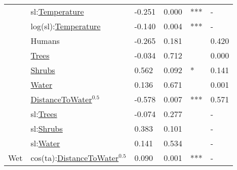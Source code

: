 \begin{tabular}[t]{llllll}
 & sl:\underline{Temperature} & -0.251 & 0.000 & *** & -\\

 & log(sl):\underline{Temperature} & -0.140 & 0.004 & *** & -\\

 & Humans & -0.265 & 0.181 &  & 0.420\\

 & \underline{Trees} & -0.034 & 0.712 &  & 0.000\\

 & \underline{Shrubs} & 0.562 & 0.092 & * & 0.141\\

 & \underline{Water} & 0.136 & 0.671 &  & 0.001\\

 & \underline{DistanceToWater}$^{0.5}$ & -0.578 & 0.007 & *** & 0.571\\

 & sl:\underline{Trees} & -0.074 & 0.277 &  & -\\

 & sl:\underline{Shrubs} & 0.383 & 0.101 &  & -\\

 & sl:\underline{Water} & 0.141 & 0.534 &  & -\\

\multirow{-16}{*}{\raggedright\arraybackslash Wet} & cos(ta):\underline{DistanceToWater}$^{0.5}$ & 0.090 & 0.001 & *** & -\\
\bottomrule
\end{tabular}
